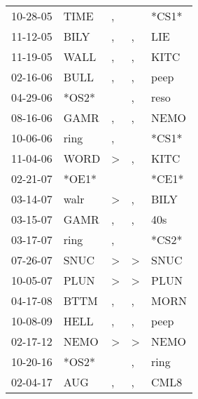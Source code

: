 \begin{supertabular}{lllll}
 10-28-05 &   TIME &             , &               &  *CS1* \\
 11-12-05 &   BILY &             , &             , &    LIE \\
 11-19-05 &   WALL &             , &             , &   KITC \\
 02-16-06 &   BULL &             , &             , &   peep \\
 04-29-06 &  *OS2* &               &             , &   reso \\
 08-16-06 &   GAMR &             , &             , &   NEMO \\
 10-06-06 &   ring &             , &               &  *CS1* \\
 11-04-06 &   WORD &  \textgreater &             , &   KITC \\
 02-21-07 &  *OE1* &               &               &  *CE1* \\
 03-14-07 &   walr &  \textgreater &             , &   BILY \\
 03-15-07 &   GAMR &             , &             , &    40s \\
 03-17-07 &   ring &             , &               &  *CS2* \\
 07-26-07 &   SNUC &  \textgreater &  \textgreater &   SNUC \\
 10-05-07 &   PLUN &  \textgreater &  \textgreater &   PLUN \\
 04-17-08 &   BTTM &             , &             , &   MORN \\
 10-08-09 &   HELL &             , &             , &   peep \\
 02-17-12 &   NEMO &  \textgreater &  \textgreater &   NEMO \\
 10-20-16 &  *OS2* &               &             , &   ring \\
 02-04-17 &    AUG &             , &             , &   CML8 \\
\end{supertabular}
